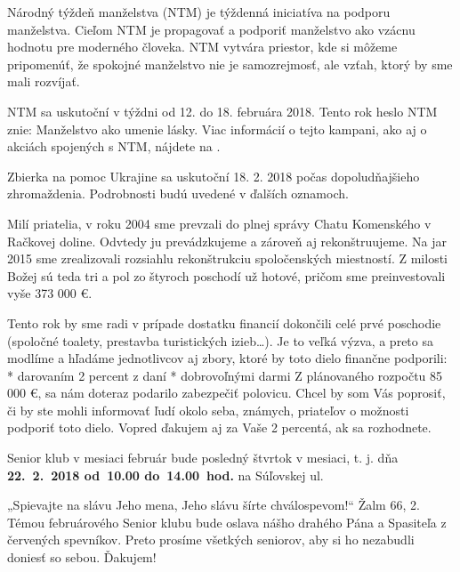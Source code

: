 
Národný týždeň manželstva (NTM) je týždenná iniciatíva na podporu manželstva. Cieľom NTM je propagovať a podporiť manželstvo ako vzácnu hodnotu pre moderného človeka. NTM vytvára priestor, kde si môžeme pripomenúť, že spokojné manželstvo nie je samozrejmosť, ale vzťah, ktorý by sme mali rozvíjať.

NTM sa uskutoční v týždni od 12. do 18. februára 2018. Tento rok heslo NTM znie: Manželstvo ako umenie lásky. Viac informácií o tejto kampani, ako aj o akciách spojených s NTM, nájdete na .


Zbierka na pomoc Ukrajine sa uskutoční 18. 2. 2018 počas dopoludňajšieho zhromaždenia. Podrobnosti budú uvedené v ďalších oznamoch.


Milí priatelia, v roku 2004 sme prevzali do plnej správy Chatu Komenského v Račkovej doline. Odvtedy ju prevádzkujeme a zároveň aj rekonštruujeme. Na jar 2015 sme zrealizovali rozsiahlu rekonštrukciu spoločenských miestností. Z milosti Božej sú teda tri a pol zo štyroch poschodí už hotové, pričom sme preinvestovali vyše 373 000 €.

Tento rok by sme radi v prípade dostatku financií dokončili celé prvé poschodie (spoločné toalety, prestavba turistických izieb…). Je to veľká výzva, a preto sa modlíme a hľadáme jednotlivcov aj zbory, ktoré by toto dielo finančne podporili:
\begitems
* darovaním 2 percent z daní
* dobrovoľnými darmi
\enditems
Z plánovaného rozpočtu 85 000 €, sa nám doteraz podarilo zabezpečiť polovicu. Chcel by som Vás poprosiť, či by ste mohli informovať ľudí okolo seba, známych, priateľov o možnosti podporiť toto dielo. Vopred ďakujem aj za Vaše 2 percentá, ak sa rozhodnete.



Senior klub v mesiaci február bude posledný štvrtok v mesiaci, t. j. dňa {\bf 22.~2.~2018 od~10.00 do~14.00~hod.} na Súľovskej ul.

„Spievajte na slávu Jeho mena, Jeho slávu šírte chválospevom!“ Žalm 66, 2.
Témou februárového Senior klubu bude oslava nášho drahého Pána a Spasiteľa z červených spevníkov. Preto prosíme všetkých seniorov, aby si ho nezabudli doniesť so sebou.
Ďakujem!

